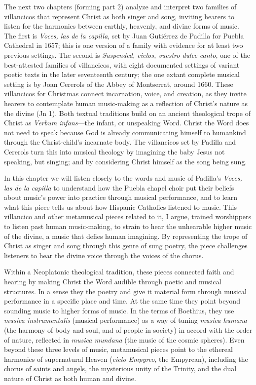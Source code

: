 The next two chapters (forming part 2) analyze and interpret two families of
villancicos that represent Christ as both singer and song, inviting hearers to
listen for the harmonies between earthly, heavenly, and divine forms of music.
The first is \emph{Voces, las de la capilla}, set by Juan Gutiérrez de Padilla
for Puebla Cathedral in 1657; this is one version of a family with evidence for
at least two previous settings.
The second is \emph{Suspended, cielos, vuestro dulce canto}, one of the
best-attested families of villancicos, with eight documented settings of variant
poetic texts in the later seventeenth century; the one extant complete musical
setting is by Joan Cererols of the Abbey of Montserrat, around 1660.
These villancicos for Christmas connect incarnation, voice, and creation, as
they invite hearers to contemplate human music-making as a reflection of
Christ's nature as the divine  (Jn 1).
Both textual traditions build on an ancient theological trope of Christ as
\emph{Verbum infans}---the infant, or unspeaking Word.
Christ the Word does not need to speak because God is already communicating
himself to humankind through the Christ-child's incarnate body.
The villancicos set by Padilla and Cererols turn this into musical theology by
imagining the baby Jesus not speaking, but singing; and by considering Christ
himself as the song being sung.

In this chapter we will listen closely to the words and music of Padilla's
\emph{Voces, las de la capilla} to understand how the Puebla chapel choir put
their beliefs about music's power into practice through musical performance, and
to learn what this piece tells us about how Hispanic Catholics listened to
music.
This villancico and other metamusical pieces related to it, I argue, trained
worshippers to listen past human music-making, to strain to hear the unhearable
higher music of the divine, a music that defies human imagining.
By representing the trope of Christ as singer and song through this genre of
sung poetry, the piece challenges listeners to hear the divine voice through the
voices of the chorus.

Within a Neoplatonic theological tradition, these pieces connected faith and
hearing by making Christ the Word audible through poetic and musical structures.
In a sense they  the poetry and give it material form through musical
performance in a specific place and time.
At the same time they point beyond sounding music to higher forms of music.
In the terms of Boethius, they use \emph{musica instrumentalis} (musical performance)
as a way of tuning \emph{musica humana} (the harmony of body and soul, and of people
in society) in accord with the order of nature, reflected in \emph{musica mundana}
(the music of the cosmic spheres).%
    \Autocite{Boethius:Musica}
Even beyond these three levels of music, metamusical pieces point to the
ethereal harmonies of supernatural Heaven (\emph{cielo Empyreo}, the Empyrean),
including the chorus of saints and angels, the mysterious unity of the Trinity,
and the dual nature of Christ as both human and divine.

